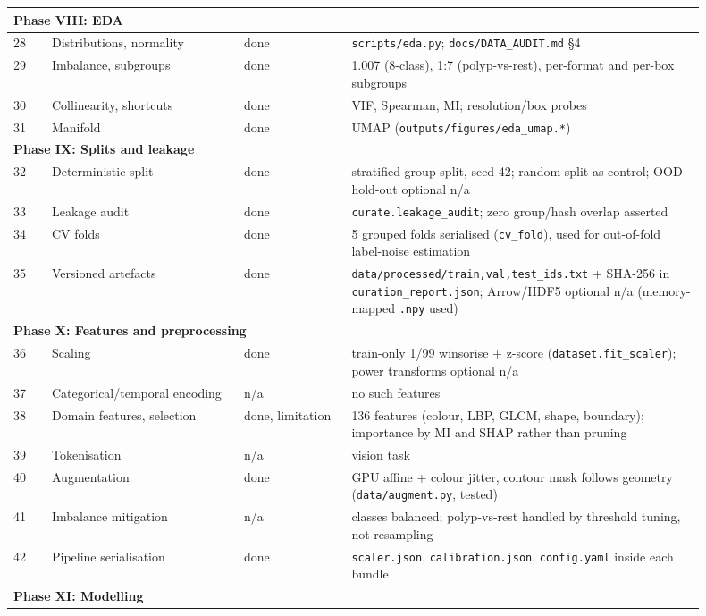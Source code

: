 \begin{longtable}{p{0.05\linewidth}p{0.25\linewidth}p{0.14\linewidth}p{0.46\linewidth}}
\midrule\multicolumn{4}{l}{\textbf{Phase VIII: EDA}}\\\midrule
28 & Distributions, normality & done & \texttt{scripts/eda.py}; \texttt{docs/DATA\_AUDIT.md} \S{}4 \\
29 & Imbalance, subgroups & done & 1.007 (8-class), 1:7 (polyp-vs-rest), per-format and per-box subgroups \\
30 & Collinearity, shortcuts & done & VIF, Spearman, MI; resolution/box probes \\
31 & Manifold & done & UMAP (\texttt{outputs/figures/eda\_umap.*}) \\
\midrule\multicolumn{4}{l}{\textbf{Phase IX: Splits and leakage}}\\\midrule
32 & Deterministic split & done & stratified group split, seed 42; random split as control; OOD hold-out optional n/a \\
33 & Leakage audit & done & \texttt{curate.leakage\_audit}; zero group/hash overlap asserted \\
34 & CV folds & done & 5 grouped folds serialised (\texttt{cv\_fold}), used for out-of-fold label-noise estimation \\
35 & Versioned artefacts & done & \texttt{data/processed/{train,val,test}\_ids.txt} + SHA-256 in \texttt{curation\_report.json}; Arrow/HDF5 optional n/a (memory-mapped \texttt{.npy} used) \\
\midrule\multicolumn{4}{l}{\textbf{Phase X: Features and preprocessing}}\\\midrule
36 & Scaling & done & train-only 1/99 winsorise + z-score (\texttt{dataset.fit\_scaler}); power transforms optional n/a \\
37 & Categorical/temporal encoding & n/a & no such features \\
38 & Domain features, selection & done, limitation & 136 features (colour, LBP, GLCM, shape, boundary); importance by MI and SHAP rather than pruning \\
39 & Tokenisation & n/a & vision task \\
40 & Augmentation & done & GPU affine + colour jitter, contour mask follows geometry (\texttt{data/augment.py}, tested) \\
41 & Imbalance mitigation & n/a & classes balanced; polyp-vs-rest handled by threshold tuning, not resampling \\
42 & Pipeline serialisation & done & \texttt{scaler.json}, \texttt{calibration.json}, \texttt{config.yaml} inside each bundle \\
\midrule\multicolumn{4}{l}{\textbf{Phase XI: Modelling}}\\\midrule

\end{longtable}
